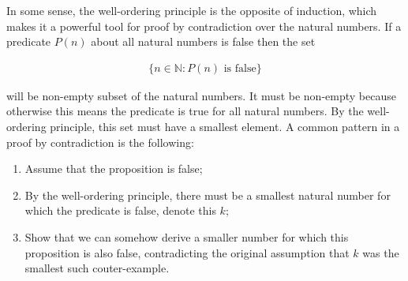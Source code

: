 \documentclass[twoside]{report}
\begin{document}
In some sense, the well-ordering principle is the opposite of induction, which makes it a powerful tool for proof by contradiction over the natural numbers. If a predicate $P(n)$ about all natural numbers is false then the set 

\begin{align*}
	\{ n \in \mathbb{N} : P(n) \text{ is false}\}
\end{align*}

will be non-empty subset of the natural numbers. It must be non-empty because otherwise this means the predicate is true for all natural numbers. By the well-ordering principle, this set must have a smallest element. A common pattern in a proof by contradiction is the following:

\vspace{\baselineskip}
\begin{enumerate}
	\item Assume that the proposition is false;
	\item By the well-ordering principle, there must be a smallest natural number for which the predicate is false, denote this $k$;
	\item Show that we can somehow derive a smaller number for which this proposition is also false, contradicting the original assumption that $k$ was the smallest such couter-example.
\end{enumerate}

\end{document}
